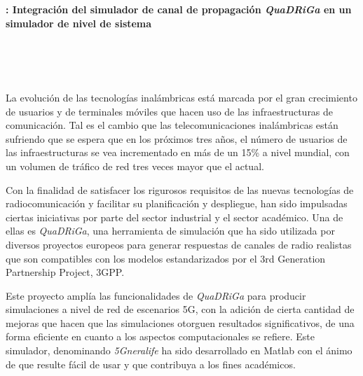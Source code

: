 



\cleardoublepage
\thispagestyle{empty}

\begin{center}
{\large\bfseries \myTitle: Integración del simulador de canal de propagación \textit{QuaDRiGa} en un simulador de nivel de sistema}\\
\end{center}
\begin{center}
\myName\\
\end{center}

\\

\vspace{0.7cm}
\\

La evolución de las tecnologías inalámbricas está marcada por el gran crecimiento de usuarios y de terminales móviles que hacen uso de las infraestructuras de comunicación. Tal es el cambio que las telecomunicaciones inalámbricas están sufriendo que se espera que en los próximos tres años, el número de usuarios de las infraestructuras se vea incrementado en más de un 15\% a nivel mundial, con un volumen de tráfico de red tres veces mayor que el actual.

Con la finalidad de satisfacer los rigurosos requisitos de las nuevas tecnologías de radiocomunicación y facilitar su planificación y despliegue, han sido impulsadas ciertas iniciativas por parte del sector industrial y el sector académico. Una de ellas es \textit{QuaDRiGa}, una herramienta de simulación que ha sido utilizada por diversos proyectos europeos para generar respuestas de canales de radio realistas que son compatibles con los modelos estandarizados por el 3rd Generation Partnership Project, 3GPP. 

Este proyecto amplía las funcionalidades de \textit{QuaDRiGa} para producir simulaciones a nivel de red de escenarios 5G, con la adición de cierta cantidad de mejoras que hacen que las simulaciones otorguen resultados significativos, de una forma eficiente en cuanto a los aspectos computacionales se refiere. Este simulador, denominando \textit{5Gneralife} ha sido desarrollado en Matlab con el ánimo de que resulte fácil de usar y que contribuya a los fines académicos.


